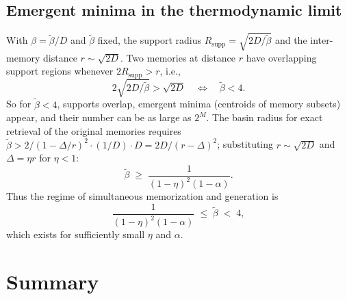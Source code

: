 \documentclass[11pt]{article}
\begin{document}
\subsection{Emergent minima in the thermodynamic limit}

With $\beta = \tilde\beta/D$ and $\tilde\beta$ fixed, the support radius
$R_{\mathrm{supp}} = \sqrt{2D/\tilde\beta}$ and the inter-memory distance
$r \sim \sqrt{2D}$.  Two memories at distance $r$ have overlapping support
regions whenever $2R_{\mathrm{supp}} > r$, i.e.,
\begin{equation}
  2\sqrt{2D/\tilde\beta} > \sqrt{2D}
  \quad\Longleftrightarrow\quad
  \tilde\beta < 4.
\end{equation}
So for $\tilde\beta < 4$, supports overlap, emergent minima (centroids of
memory subsets) appear, and their number can be as large as $2^M$.  The
basin radius for exact retrieval of the original memories requires
$\tilde\beta > 2/(1 - \Delta/r)^2 \cdot (1/D) \cdot D = 2D/(r-\Delta)^2$;
substituting $r \sim \sqrt{2D}$ and $\Delta = \eta r$ for $\eta < 1$:
\begin{equation}
  \tilde\beta \;\geq\; \frac{1}{(1-\eta)^2(1-\alpha)}.
\end{equation}
Thus the regime of simultaneous memorization and generation is
\begin{equation}
  \frac{1}{(1-\eta)^2(1-\alpha)} \;\leq\; \tilde\beta \;<\; 4,
\end{equation}
which exists for sufficiently small $\eta$ and $\alpha$.

\section{Summary}
\end{document}
